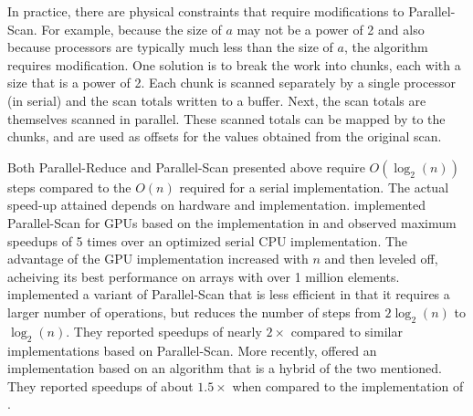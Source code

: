 {%

In practice, there are physical constraints that require modifications to Parallel-Scan. For example, because the size of $a$ may not be a power of 2 and also because processors are typically much less than the size of $a$, the algorithm requires modification. One solution is to break the work into chunks, each with a size that is a power of 2. Each chunk is scanned separately by a single processor (in serial) and the scan totals written to a buffer. Next, the scan totals are themselves scanned in parallel. These scanned totals can be mapped by to the chunks, and are used as offsets for the values obtained from the original scan.

Both Parallel-Reduce and Parallel-Scan presented above require $O(\log_2(n))$ steps compared to the $O(n)$ required for a serial implementation. 
The actual speed-up attained depends on hardware and implementation. \citet{harris-scan} implemented Parallel-Scan for GPUs based on the implementation in \citet{blelloch1990} and observed maximum speedups of 5 times over an optimized serial CPU implementation. The advantage of the GPU implementation increased with $n$ and then leveled off, acheiving its best performance on arrays with over 1 million elements. \citet{sengupta2008} implemented a variant of Parallel-Scan that is less efficient in that it requires a larger number of operations, but reduces the number of steps from $2\log_2(n)$ to $\log_2(n)$. They reported speedups of nearly $2\times$ compared to similar implementations based on Parallel-Scan. More recently, \citet{ha2013} offered an implementation based on an algorithm that is a hybrid of the two mentioned. They reported speedups of about $1.5\times$ when compared to the implementation of \citet{sengupta}.

}

